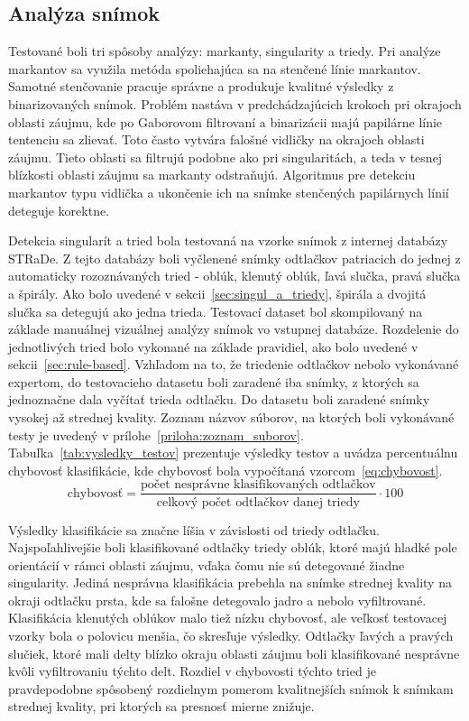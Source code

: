   \subsection{Analýza snímok}
  Testované boli tri spôsoby analýzy: markanty, singularity a triedy. Pri analýze markantov sa využila metóda spoliehajúca sa na stenčené línie markantov.
  Samotné stenčovanie pracuje správne a produkuje kvalitné výsledky z binarizovaných snímok. Problém nastáva v predchádzajúcich krokoch pri okrajoch oblasti
  záujmu, kde po Gaborovom filtrovaní a binarizácii majú papilárne línie tentenciu sa zlievať. Toto často vytvára falošné vidličky na okrajoch oblasti
  záujmu. Tieto oblasti sa filtrujú podobne ako pri singularitách, a teda v tesnej blízkosti oblasti záujmu sa markanty odstraňujú.
  Algoritmus pre detekciu markantov typu vidlička a ukončenie ich na snímke stenčených papilárnych línií deteguje korektne.

  Detekcia singularít a tried bola testovaná na vzorke snímok z internej databázy STRaDe. Z tejto databázy boli vyčlenené snímky odtlačkov patriacich do
  jednej z automaticky rozoznávaných tried - oblúk, klenutý oblúk, ľavá slučka, pravá slučka a špirály. Ako bolo uvedené v sekcii~{\ref{sec:singul_a_triedy}},
  špirála a dvojitá slučka sa detegujú ako jedna trieda. Testovací dataset bol skompilovaný na základe manuálnej vizuálnej analýzy snímok vo vstupnej
  databáze. Rozdelenie do jednotlivých tried bolo vykonané na základe pravidiel, ako bolo uvedené v sekcii~{\ref{sec:rule-based}}. Vzhľadom na to, že
  triedenie odtlačkov nebolo vykonávané expertom, do testovacieho datasetu boli zaradené iba snímky, z ktorých sa jednoznačne dala vyčítať trieda odtlačku.
  Do datasetu boli zaradené snímky vysokej až strednej kvality. Zoznam názvov súborov, na ktorých boli vykonávané testy je uvedený v
  prílohe~{\ref{priloha:zoznam_suborov}}. Tabuľka~{\ref{tab:vysledky_testov}} prezentuje výsledky testov a uvádza percentuálnu chybovosť klasifikácie, kde
  chybovosť bola vypočítaná vzorcom~{\ref{eq:chybovost}}.
  \begin{equation}
    \text{chybovosť} = \frac{\text{počet nesprávne klasifikovaných odtlačkov}}{\text{celkový počet odtlačkov danej triedy}} \cdot 100
    \label{eq:chybovost}
  \end{equation}

  Výsledky klasifikácie sa značne líšia v závislosti od triedy odtlačku. Najspoľahlivejšie boli klasifikované odtlačky triedy oblúk, ktoré majú hladké
  pole orientácií v rámci oblasti záujmu, vďaka čomu nie sú detegované žiadne singularity. Jediná nesprávna klasifikácia prebehla na snímke strednej kvality
  na okraji odtlačku prsta, kde sa falošne detegovalo jadro a nebolo vyfiltrované. Klasifikácia klenutých oblúkov malo tiež nízku chybovosť, ale veľkosť
  testovacej vzorky bola o polovicu menšia, čo skresľuje výsledky.
  Odtlačky ľavých a pravých slučiek, ktoré mali delty blízko okraju oblasti záujmu boli klasifikované nesprávne kvôli vyfiltrovaniu týchto delt. Rozdiel v
  chybovosti týchto tried je pravdepodobne spôsobený rozdielnym pomerom kvalitnejších snímok k snímkam strednej kvality, pri ktorých sa presnosť mierne
  znižuje.


